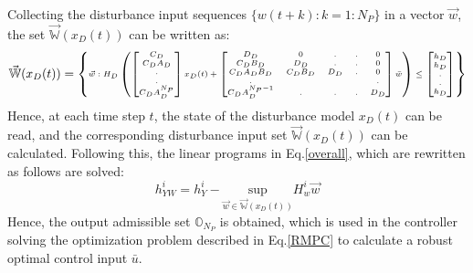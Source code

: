 \documentclass[letterpaper, 10 pt, conference]{ieeeconf}  %
\begin{document}
    Collecting the disturbance input sequences  $\{w(t+k):k=1:N_P\}$ in a vector $\vec{w}$, the set $\vec{\mathbb{W}}(x_D(t))$ can be written as:
    \begin{equation}
    \tiny
    \vec{\mathbb{W}}(x_D(t))=\begin{Bmatrix}\vec{w}:H_D\begin{pmatrix}\begin{bmatrix}C_D \\ C_DA_D\\ . \\ . \\ C_DA_D^{N_P}\end{bmatrix}x_D(t) + \begin{bmatrix}
    D_D & 0 & . & . & 0 \\
    C_DB_D & D_D & . & . & 0 \\
    C_DA_DB_D & C_DB_D & D_D & . & 0 \\
    . &  &  &  & . \\
    C_DA_D^{N_P-1} & . & . & . & D_D
    \end{bmatrix}\bar{w}\end{pmatrix} \leq \begin{bmatrix} h_D \\ h_D \\ . \\ . \\ h_D \end{bmatrix} 
    \end{Bmatrix}
    \end{equation}      
    Hence, at each time step $t$, the state of the disturbance model $x_D(t)$ can be read, and the corresponding disturbance input set $\vec{\mathbb{W}}(x_D(t))$ can be calculated. Following this, the linear programs in  Eq.\eqref{overall}, which are rewritten as follows are solved:
    \begin{equation}
    h_{YW}^i = h_Y^i-\underset{\vec{w}\in \vec{\mathbb{W}}(x_D(t))}{\text{sup}} H_w^i \vec{w}  
    \end{equation}     
    Hence, the output admissible set $\mathbb{O}_{N_P}$ is obtained, which is used in the controller solving the optimization problem described in Eq.\eqref{RMPC} to calculate a robust optimal control input $\bar{u}$.
%
\end{document}
